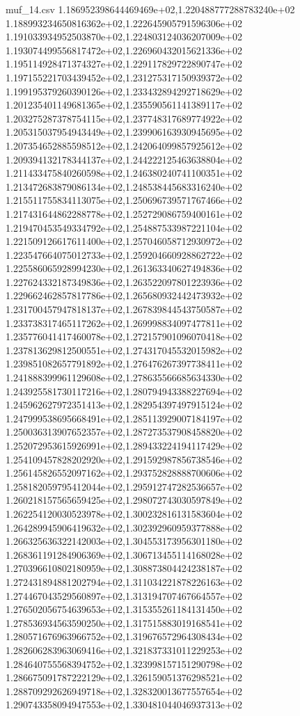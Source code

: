 \begin{filecontents*}{muf_14.csv}
1.186952398644469469e+02,1.220488777288783240e+02
1.188993234650816362e+02,1.222645905791596306e+02
1.191033934952503870e+02,1.224803124036207009e+02
1.193074499556817472e+02,1.226960432015621336e+02
1.195114928471374327e+02,1.229117829722890747e+02
1.197155221703439452e+02,1.231275317150939372e+02
1.199195379260390126e+02,1.233432894292718629e+02
1.201235401149681365e+02,1.235590561141389117e+02
1.203275287378754115e+02,1.237748317689774922e+02
1.205315037954943449e+02,1.239906163930945695e+02
1.207354652885598512e+02,1.242064099857925612e+02
1.209394132178344137e+02,1.244222125463638804e+02
1.211433475840260598e+02,1.246380240741100351e+02
1.213472683879086134e+02,1.248538445683316240e+02
1.215511755834113075e+02,1.250696739571767466e+02
1.217431644862288778e+02,1.252729086759400161e+02
1.219470453549334792e+02,1.254887533987221104e+02
1.221509126617611400e+02,1.257046058712930972e+02
1.223547664075012733e+02,1.259204660928862722e+02
1.225586065928994230e+02,1.261363340627494836e+02
1.227624332187349836e+02,1.263522097801223936e+02
1.229662462857817786e+02,1.265680932442473932e+02
1.231700457947818137e+02,1.267839844543750587e+02
1.233738317465117262e+02,1.269998834097477811e+02
1.235776041417460078e+02,1.272157901096070418e+02
1.237813629812500551e+02,1.274317045532015982e+02
1.239851082657791892e+02,1.276476267397738411e+02
1.241888399961129608e+02,1.278635566685634330e+02
1.243925581730117216e+02,1.280794943388227694e+02
1.245962627972351413e+02,1.282954397497915124e+02
1.247999538695668491e+02,1.285113929007184197e+02
1.250036313907652357e+02,1.287273537908458820e+02
1.252072953615926991e+02,1.289433224194117429e+02
1.254109457828202920e+02,1.291592987856738546e+02
1.256145826552097162e+02,1.293752828888700606e+02
1.258182059795412044e+02,1.295912747282536657e+02
1.260218157565659425e+02,1.298072743030597849e+02
1.262254120030523978e+02,1.300232816131583604e+02
1.264289945906419632e+02,1.302392960959377888e+02
1.266325636322142003e+02,1.304553173956301180e+02
1.268361191284906369e+02,1.306713455114168028e+02
1.270396610802180959e+02,1.308873804424238187e+02
1.272431894881202794e+02,1.311034221878226163e+02
1.274467043529560897e+02,1.313194707467664557e+02
1.276502056754639653e+02,1.315355261184131450e+02
1.278536934563590250e+02,1.317515883019168541e+02
1.280571676963966752e+02,1.319676572964308434e+02
1.282606283963069416e+02,1.321837331011229253e+02
1.284640755568394752e+02,1.323998157151290798e+02
1.286675091787222129e+02,1.326159051376298521e+02
1.288709292626949718e+02,1.328320013677557654e+02
1.290743358094947553e+02,1.330481044046937313e+02

\end{filecontents*}
